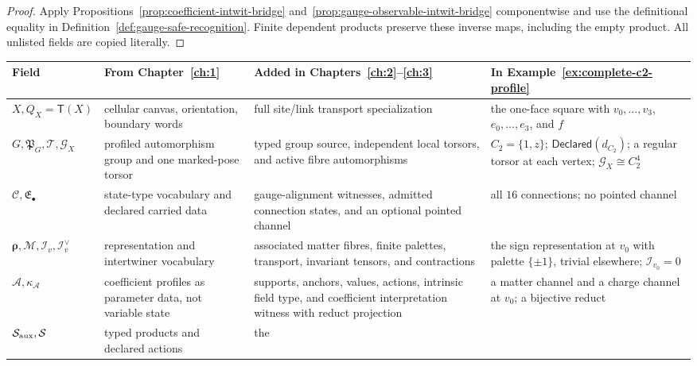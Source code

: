 \begin{proof}
Apply Propositions~\ref{prop:coefficient-intwit-bridge}
and~\ref{prop:gauge-observable-intwit-bridge} componentwise and use the
definitional equality in Definition~\ref{def:gauge-safe-recognition}.  Finite
dependent products preserve these inverse maps, including the empty product.
All unlisted fields are copied literally.
\end{proof}

\begin{table}[!tb]
\centering
\footnotesize
\renewcommand{\arraystretch}{1.15}
\begin{tabularx}{\textwidth}{@{}>{\raggedright\arraybackslash}p{}
  >{\raggedright\arraybackslash}p{}
  >{\raggedright\arraybackslash}p{}
  >{\raggedright\arraybackslash}X@{}}
\toprule
\textbf{Field} & \textbf{From Chapter~\ref{ch:1}} &
\textbf{Added in Chapters~\ref{ch:2}--\ref{ch:3}} &
\textbf{In Example~\ref{ex:complete-c2-profile}}\\
\midrule
$X,Q_X=\mathsf T(X)$ & cellular canvas, orientation, boundary words & full
site/link transport specialization & the one-face square with $v_0,\ldots,v_3$,
$e_0,\ldots,e_3$, and $f$\\
$G,\mathfrak P_G,\mathcal T,\mathscr G_X$ & profiled automorphism group and
one marked-pose torsor & typed group source, independent local torsors, and
active fibre automorphisms & $C_2=\{1,z\}$; $\mathsf{Declared}(d_{C_2})$; a
regular torsor at each vertex; $\mathscr G_X\cong C_2^4$\\
$\mathcal C,\mathfrak E_{\bullet}$ & state-type vocabulary and declared
carried data & gauge-alignment witnesses, admitted connection states, and an
optional pointed channel & all $16$ connections; no pointed channel\\
$\boldsymbol\rho,\mathcal M,\mathcal I_v,\mathcal I_v^{\vee}$ &
representation and intertwiner vocabulary & associated matter fibres, finite
palettes, transport, invariant tensors, and contractions & the sign
representation at $v_0$ with palette $\{\pm1\}$, trivial elsewhere;
$\mathcal I_{v_0}=0$\\
$\mathcal A,\kappa_{\mathcal A}$ & coefficient profiles as parameter data,
not variable state & supports, anchors, values, actions, intrinsic field
type, and coefficient interpretation witness with reduct projection & a
matter channel and a charge channel at $v_0$; a bijective reduct\\
$\mathcal S_{\rm aux},\mathcal S$ & typed products and declared actions & the

\end{tabularx}
\end{table}
